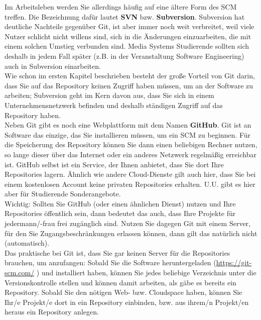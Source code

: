 Im Arbeitsleben werden Sie allerdings häufig auf eine ältere Form des SCM treffen. Die Bezeichnung dafür lautet \textbf{SVN} bzw. \textbf{Subversion}. Subversion hat deutliche Nachteile gegenüber Git, ist aber immer noch weit verbreitet, weil viele Nutzer schlicht nicht willens sind, sich in die Änderungen einzuarbeiten, die mit einem solchen Umstieg verbunden sind. Media Systems Studierende sollten sich deshalb in jedem Fall später (z.B. in der Veranstaltung Software Engineering) auch in Subversion einarbeiten.\\

Wie schon im ersten Kapitel beschrieben besteht der große Vorteil von Git darin, dass Sie auf das Repository keinen Zugriff haben müssen, um an der Software zu arbeiten; Subversion geht im Kern davon aus, dass Sie sich in einem Unternehmensnetzwerk befinden und deshalb ständigen Zugriff auf das Repository haben.\\

Neben Git gibt es noch eine Webplattform mit dem Namen \textbf{GitHub}. Git ist an Software das einzige, das Sie installieren müssen, um ein SCM zu beginnen. Für die Speicherung des Repository können Sie dann einen beliebigen Rechner nutzen, so lange dieser über das Internet oder ein anderes Netzwerk regelmäßig erreichbar ist. GitHub selbst ist ein Service, der Ihnen anbietet, dass Sie dort Ihre Repositories lagern. Ähnlich wie andere Cloud-Dienste gilt auch hier, dass Sie bei einem kostenlosen Account keine privaten Repositories erhalten. U.U. gibt es hier aber für Studierende Sonderangebote.\\

Wichtig: Sollten Sie GitHub (oder einen ähnlichen Dienst) nutzen und Ihre Repositories öffentlich sein, dann bedeutet das auch, dass Ihre Projekte für jedermann/-frau frei zugänglich sind. Nutzen Sie dagegen Git mit einem Server, für den Sie Zugangsbeschränkungen erlassen können, dann gilt das natürlich nicht (automatisch).\\

Das praktische bei Git ist, dass Sie gar keinen Server für die Repositories brauchen, um anzufangen: Sobald Sie die Software heruntergeladen (\url{https://git-scm.com/} ) und installiert haben, können Sie jedes beliebige Verzeichnis unter die Versionskontrolle stellen und können damit arbeiten, als gäbe es bereits ein Repository. Sobald Sie den nötigen Web- bzw. Cloudspace haben, können Sie Ihr/e Projekt/e dort in ein Repository einbinden, bzw. aus ihrem/n Projekt/en heraus ein Repository anlegen.\\

